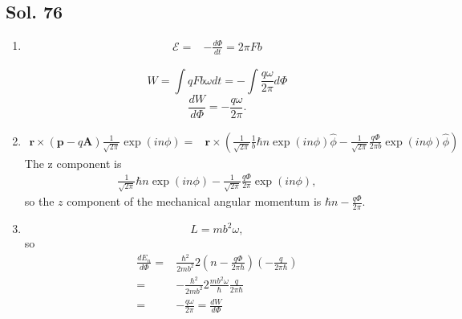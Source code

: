  \subsection*{Sol. 76}
 \begin{enumerate}
     \item 
     \begin{align*}
        \mathcal{E}
         =&-\frac{d\Phi}{dt}
         =2\pi Fb
     \end{align*}
     
     $$
     W = \int qF b\omega dt
     =-\int \frac{q\omega}{2\pi} d\Phi
     $$
     $$
     \frac{dW}{d\Phi}
     =-\frac{q\omega}{2\pi}.
     $$
     \item 
     \begin{align*}
         \bm r\times (\bm p - q\bm A)
         \frac{1}{\sqrt{2\pi}}
         \exp\left(
         in\phi
         \right)
         =&
         \bm r\times 
         (\frac{1}{\sqrt{2\pi}}\frac{1}{b}
         \hbar n
         \exp\left(
         in\phi
         \right)\hat\phi -
         \frac{1}{\sqrt{2\pi}}
         \frac{q\Phi}{2\pi b}
         \exp\left(
         in\phi
         \right)\hat\phi
         )
     \end{align*}
     The z component is 
     \begin{align*}
         \frac{1}{\sqrt{2\pi}}
         \hbar n
         \exp\left(
         in\phi
         \right) -
         \frac{1}{\sqrt{2\pi}}
         \frac{q\Phi}{2\pi}
         \exp\left(
         i n\phi
         \right),
     \end{align*}
     so the $z$ component of the mechanical angular momentum is 
     $\hbar n-\frac{q\Phi}{2\pi}.$
     \item 
     $$
     L = mb^2\omega,
     $$
     so
     \begin{align*}
         \frac{dE_n}{d\Phi}
         =&
         \frac{\hbar^2}{2mb^2}
         2\left(
         n-\frac{q\Phi}{2\pi\hbar}
         \right)
         (-\frac{q}{2\pi\hbar})\\
         =&
         -
         \frac{\hbar^2}{2mb^2}
         2\frac{mb^2\omega}{\hbar}
         \frac{q}{2\pi\hbar}\\
         =&-
         \frac{q\omega}{2\pi}
         =\frac{dW}{d\Phi}
     \end{align*}
 \end{enumerate}